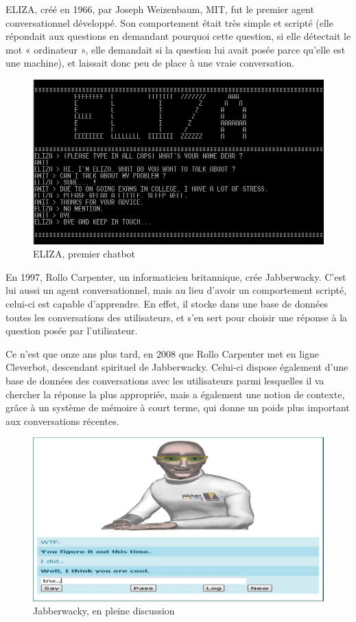 \documentclass[a4paper, 12pt]{article} %
\begin{document}
ELIZA, créé en 1966, par Joseph Weizenbaum, MIT, fut le premier agent conversationnel développé. Son comportement était très simple et scripté (elle répondait aux questions en demandant pourquoi cette question, si elle détectait le mot « ordinateur », elle demandait si la question lui avait posée parce qu’elle est une machine), et laissait donc peu de place à une vraie conversation.


\begin{figure}[!h]%
	\begin{center} 
		\includegraphics[width=0.60\columnwidth]{images/eliza.png}%
		\caption{ELIZA, premier chatbot}%
	\end{center}
\end{figure}

En 1997, Rollo Carpenter, un informaticien britannique, crée Jabberwacky. C’est lui aussi un agent conversationnel, mais au lieu d’avoir un comportement scripté, celui-ci est capable d’apprendre. En effet, il stocke dans une base de données toutes les conversations des utilisateurs, et s’en sert pour choisir une réponse à la question posée par l’utilisateur.

Ce n’est que onze ans plus tard, en 2008 que Rollo Carpenter met en ligne Cleverbot, descendant spirituel de Jabberwacky. Celui-ci dispose également d’une base de données des conversations avec les utilisateurs parmi lesquelles il va chercher la réponse la plus appropriée, mais a également une notion de contexte, grâce à un système de mémoire à court terme, qui donne un poids plus important aux conversations récentes.

\newpage
\begin{figure}[!h]%
	\begin{center} 
		\includegraphics[width=0.60\columnwidth]{images/jabberwacky.jpg}%
		\caption{Jabberwacky, en pleine discussion}%
	\end{center}
\end{figure}
\end{document}
